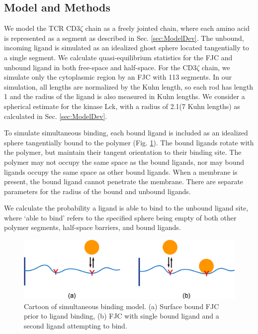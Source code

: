 \documentclass[../../AdvancementSummary.tex]{subfiles}
\begin{document}
\subsection{Model and Methods}

We model the TCR CD3$\zeta$ chain as a freely jointed chain, where each amino acid is represented as a segment as described in Sec. \ref{sec:ModelDev}. The unbound, incoming ligand is simulated as an idealized ghost sphere located tangentially to a single segment. We calculate quasi-equilibrium statistics for the FJC and unbound ligand in both free-space and half-space. For the CD3$\zeta$ chain, we simulate only the cytoplasmic region by an FJC with 113 segments. In our simulation, all lengths are normalized by the Kuhn length, so each rod has length 1 and the radius of the ligand is also measured in Kuhn lengths. We consider a spherical estimate for the kinase Lck, with a radius of 2.1\nm (7 Kuhn lengths) as calculated in Sec. \ref{sec:ModelDev}.

To simulate simultaneous binding, each bound ligand is included as an idealized sphere tangentially bound to the polymer (Fig. \ref{fig: SimBindCartoon}). The bound ligands rotate with the polymer, but maintain their tangent orientation to their binding site. The polymer may not occupy the same space as the bound ligands, nor may bound ligands occupy the same space as other bound ligands. When a membrane is present, the bound ligand cannot penetrate the membrane. There are separate parameters for the radius of the bound and unbound ligands. 

We calculate the probability a ligand is able to bind to the unbound ligand site, where `able to bind' refers to the specified sphere being empty of both other polymer segments, half-space barriers, and bound ligands. 

\begin{figure}
\begin{center}
    \includegraphics[width=0.8\linewidth]{ResultsFigures/SimultaneousBindingDiagram/SimultaneousBindingDiagram.eps}
    \caption{Cartoon of simultaneous binding model. (a) Surface bound FJC prior to ligand binding, (b) FJC with single bound ligand and a second ligand attempting to bind. \label{fig: SimBindCartoon}}
    \end{center}
\end{figure}
\end{document}
